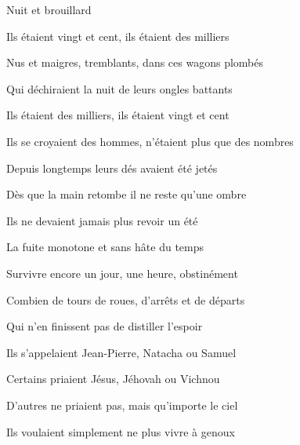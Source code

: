{

\setlength{\parskip}{0pt}

\begin{center}
Nuit et brouillard \end{center}


Ils étaient vingt et cent, ils étaient des milliers

Nus et maigres, tremblants, dans ces wagons plombés

Qui déchiraient la nuit de leurs ongles battants

Ils étaient des milliers, ils étaient vingt et cent

\bigskip

Ils se croyaient des hommes, n'étaient plus que des nombres

Depuis longtemps leurs dés avaient été jetés

Dès que la main retombe il ne reste qu'une ombre

Ils ne devaient jamais plus revoir un été

\bigskip

La fuite monotone et sans hâte du temps

Survivre encore un jour, une heure, obstinément

Combien de tours de roues, d'arrêts et de départs

Qui n'en finissent pas de distiller l'espoir

\bigskip

Ils s'appelaient Jean-Pierre, Natacha ou Samuel

Certains priaient Jésus, Jéhovah ou Vichnou

D'autres ne priaient pas, mais qu'importe le ciel

Ils voulaient simplement ne plus vivre à genoux

}
